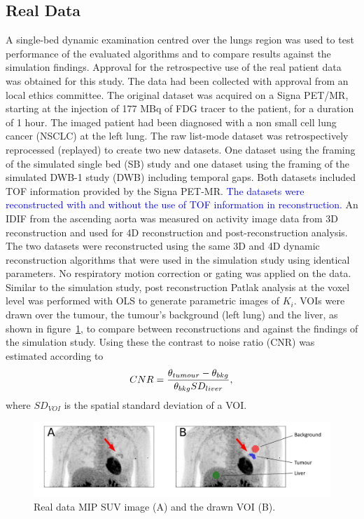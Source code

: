 \subsection*{Real Data}
A single-bed dynamic examination centred over the lungs region was used to test performance of the evaluated algorithms and to compare results against the simulation findings. Approval for the retrospective use of the real patient data  was obtained for this study. The data had been collected with approval from an local ethics committee.
The original dataset was acquired on a Signa PET/MR, starting at the injection of 177 MBq of FDG tracer to the patient, for a duration of 1 hour. The imaged patient had been diagnosed with a non small cell lung cancer (NSCLC) at the left lung. 
The raw list-mode dataset was retrospectively reprocessed (replayed) to create two new datasets. One dataset using the framing of the simulated single bed (SB) study and one dataset using the framing of the simulated DWB-1 study (DWB) including temporal gaps.
Both datasets included TOF information provided by the Signa PET-MR. %
\textcolor{blue}{The datasets were reconstructed with and without the use of TOF information in reconstruction.}
An IDIF from the ascending aorta was measured on activity image data from 3D reconstruction and used for 4D reconstruction and post-reconstruction analysis. The two datasets were reconstructed using the same 3D and 4D dynamic reconstruction algorithms that were used in the simulation study using identical parameters. No respiratory motion correction or gating was applied on the data.
Similar to the simulation study, post reconstruction Patlak analysis at the voxel level was performed with OLS to generate parametric images of $K_i$.
VOIs were drawn over the tumour, the tumour's background (left lung) and the liver, as shown in figure~\ref{fig:2_5_VOIs}, to compare between reconstructions and against the findings of the simulation study. Using these the contrast to noise ratio (CNR) was estimated according to
\begin{equation}
CNR = \frac{\theta_{tumour} - \theta_{bkg}}{\theta_{bkg} SD_{liver}} \\, \\ 
\end{equation}
where $SD_{VOI}$ is the spatial standard deviation of a VOI. 
\begin{figure} [ht!]
\centering
\includegraphics[scale=0.47,angle=0]{3_Results/3_2_Dynamic_Reconstruction_SimulationStudy/figures/RealDataVOIs.pdf}
\caption{Real data MIP SUV image (A) and the drawn VOI (B).}
\label{fig:2_5_VOIs}
\end{figure} 

